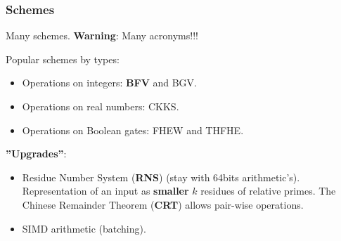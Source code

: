 \documentclass[10pt,handout]{beamer}
\begin{document}
\begin{frame}
    \frametitle{Schemes}

    Many schemes. \textbf{Warning}: Many acronyms!!!

    Popular schemes by types:
    \begin{itemize}\vspace{-0.2cm}
        \item Operations on integers: \textbf{BFV} and BGV.\vspace{-0.2cm}
\pause
        \item Operations on real numbers: CKKS.\vspace{-0.2cm}
        \item Operations on Boolean gates: FHEW and THFHE.
    \end{itemize}

\pause
    \textbf{''Upgrades''}:
\begin{itemize}\vspace{-0.2cm}
    \item Residue Number System (\textbf{RNS}) (stay with 64bits arithmetic's).
        Representation of an input as \textbf{smaller} $k$ residues of relative primes.
        The Chinese Remainder Theorem (\textbf{CRT}) allows pair-wise operations.
 \vspace{-0.2cm}
\pause
   \item SIMD arithmetic (batching).
\end{itemize}


\end{frame}

\end{document}
